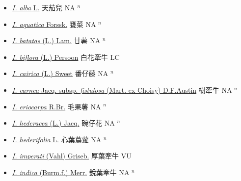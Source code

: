 \begin{itemize}
  \begin{itemize}
        \item[] \href{http://www.theplantlist.org/tpl1.1/search?q=Ipomoea+alba}{\textit{I. alba} L.}   天茄兒 NA $^n$
        \item[] \href{http://www.theplantlist.org/tpl1.1/search?q=Ipomoea+aquatica}{\textit{I. aquatica} Forssk.}   甕菜 NA $^n$
        \item[] \href{http://www.theplantlist.org/tpl1.1/search?q=Ipomoea+batatas}{\textit{I. batatas} (L.) Lam.}   甘薯 NA $^n$
        \item[] \href{http://www.theplantlist.org/tpl1.1/search?q=Ipomoea+biflora}{\textit{I. biflora} (L.) Persoon}   白花牽牛 LC
        \item[] \href{http://www.theplantlist.org/tpl1.1/search?q=Ipomoea+cairica}{\textit{I. cairica} (L.) Sweet}   番仔藤 NA $^n$
        \item[] \href{http://www.theplantlist.org/tpl1.1/search?q=Ipomoea+carnea+subsp.+fistulosa}{\textit{I. carnea} Jacq. subsp. \textit{fistulosa} (Mart. ex Choisy) D.F.Austin}   樹牽牛 NA $^n$
        \item[] \href{http://www.theplantlist.org/tpl1.1/search?q=Ipomoea+eriocarpa}{\textit{I. eriocarpa} R.Br.}   毛果薯 NA $^n$
        \item[] \href{http://www.theplantlist.org/tpl1.1/search?q=Ipomoea+hederacea}{\textit{I. hederacea} (L.) Jacq.}   碗仔花 NA $^n$
        \item[] \href{http://www.theplantlist.org/tpl1.1/search?q=Ipomoea+hederifolia}{\textit{I. hederifolia} L.}   心葉蔦蘿 NA $^n$
        \item[] \href{http://www.theplantlist.org/tpl1.1/search?q=Ipomoea+imperati}{\textit{I. imperati} (Vahl) Griseb.}   厚葉牽牛 VU
        \item[] \href{http://www.theplantlist.org/tpl1.1/search?q=Ipomoea+indica}{\textit{I. indica} (Burm.f.) Merr.}   銳葉牽牛 NA $^n$

\end{itemize}
\end{itemize}
